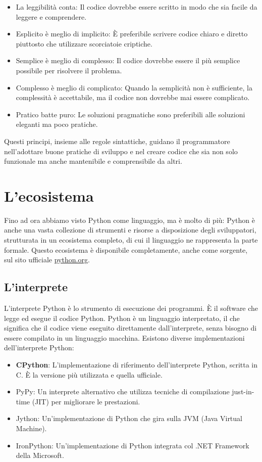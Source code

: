 \documentclass[
  letterpaper,
]{scrbook}
\begin{document}
\begin{itemize}
\item
  La leggibilità conta: Il codice dovrebbe essere scritto in modo che
  sia facile da leggere e comprendere.
\item
  Esplicito è meglio di implicito: È preferibile scrivere codice chiaro
  e diretto piuttosto che utilizzare scorciatoie criptiche.
\item
  Semplice è meglio di complesso: Il codice dovrebbe essere il più
  semplice possibile per risolvere il problema.
\item
  Complesso è meglio di complicato: Quando la semplicità non è
  sufficiente, la complessità è accettabile, ma il codice non dovrebbe
  mai essere complicato.
\item
  Pratico batte puro: Le soluzioni pragmatiche sono preferibili alle
  soluzioni eleganti ma poco pratiche.
\end{itemize}

Questi principi, insieme alle regole sintattiche, guidano il
programmatore nell'adottare buone pratiche di sviluppo e nel creare
codice che sia non solo funzionale ma anche mantenibile e comprensibile
da altri.

\section{L'ecosistema}\label{lecosistema}

Fino ad ora abbiamo visto Python come linguaggio, ma è molto di più:
Python è anche una vasta collezione di strumenti e risorse a
disposizione degli sviluppatori, strutturata in un ecosistema completo,
di cui il linguaggio ne rappresenta la parte formale. Questo ecosistema
è disponibile completamente, anche come sorgente, sul sito ufficiale
\href{https://www.python.org/}{python.org}.

\subsection{L'interprete}\label{linterprete}

L'interprete Python è lo strumento di esecuzione dei programmi. È il
software che legge ed esegue il codice Python. Python è un linguaggio
interpretato, il che significa che il codice viene eseguito direttamente
dall'interprete, senza bisogno di essere compilato in un linguaggio
macchina. Esistono diverse implementazioni dell'interprete Python:

\begin{itemize}
\item
  \textbf{CPython}: L'implementazione di riferimento dell'interprete
  Python, scritta in C. È la versione più utilizzata e quella ufficiale.
\item
  PyPy: Un interprete alternativo che utilizza tecniche di compilazione
  just-in-time (JIT) per migliorare le prestazioni.
\item
  Jython: Un'implementazione di Python che gira sulla JVM (Java Virtual
  Machine).
\item
  IronPython: Un'implementazione di Python integrata col .NET Framework
  della Microsoft.
\end{itemize}
\end{document}
